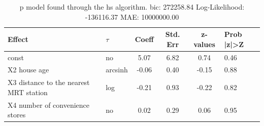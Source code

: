 \begin{table}
	\caption{p model found through the hs algorithm. bic: 272258.84 Log-Likelihood: -136116.37 MAE: 10000000.00}
	\begin{center}
		\begin{tabular}{|l|l|c|c|c|l|}
			\hline
			Effect & $\tau$ & Coeff & Std. Err & z-values & Prob |z|>Z \\
			\hline
			const & no & 5.07 & 6.82 & 0.74 & 0.46 \\
			\hline
			X2 house age & arcsinh & -0.06 & 0.40 & -0.15 & 0.88 \\
			\hline
			X3 distance to the nearest MRT station & log & -0.21 & 0.93 & -0.22 & 0.82 \\
			\hline
			X4 number of convenience stores & no & 0.02 & 0.29 & 0.06 & 0.95 \\
			\hline
		\end{tabular}
	\end{center}
\end{table}